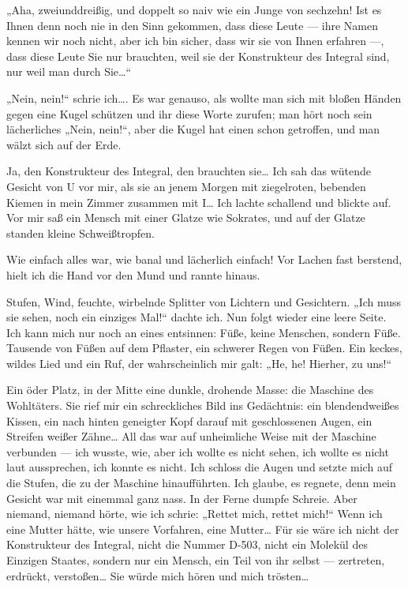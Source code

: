 „Aha, zweiunddreißig, und doppelt so naiv wie ein Junge von
sechzehn! Ist es Ihnen denn noch nie in den Sinn gekommen, dass
diese Leute — ihre Namen kennen wir noch nicht, aber ich bin
sicher, dass wir sie von Ihnen erfahren —, dass diese Leute Sie nur
brauchten, weil sie der Konstrukteur des Integral sind, nur weil
man durch Sie\ldots{}“

„Nein, nein!“ schrie ich\ldots{}. Es war genauso, als wollte man sich
mit bloßen Händen gegen eine Kugel schützen und ihr diese Worte
zurufen; man hört noch sein lächerliches „Nein, nein!“, aber die
Kugel hat einen schon getroffen, und man wälzt sich auf der Erde.

Ja, den Konstrukteur des Integral, den brauchten sie\ldots{} Ich sah das
wütende Gesicht von U vor mir, als sie an jenem Morgen mit
ziegelroten, bebenden Kiemen in mein Zimmer zusammen mit I\ldots{} Ich
lachte schallend und blickte auf. Vor mir saß ein Mensch mit einer
Glatze wie Sokrates, und auf der Glatze standen kleine
Schweißtropfen.

Wie einfach alles war, wie banal und lächerlich einfach! Vor Lachen
fast berstend, hielt ich die Hand vor den Mund und rannte hinaus.

Stufen, Wind, feuchte, wirbelnde Splitter von Lichtern und
Gesichtern. „Ich muss sie sehen, noch ein einziges Mal!“ dachte
ich. Nun folgt wieder eine leere Seite. Ich kann mich nur noch an
eines entsinnen: Füße, keine Menschen, sondern Füße. Tausende von
Füßen auf dem Pflaster, ein schwerer Regen von Füßen. Ein keckes,
wildes Lied und ein Ruf, der wahrscheinlich mir galt: „He, he!
Hierher, zu uns!“

Ein öder Platz, in der Mitte eine dunkle, drohende Masse: die
Maschine des Wohltäters. Sie rief mir ein schreckliches Bild ins
Gedächtnis: ein blendendweißes Kissen, ein nach hinten geneigter
Kopf darauf mit geschlossenen Augen, ein Streifen weißer Zähne\ldots{}
All das war auf unheimliche Weise mit der Maschine verbunden — ich
wusste, wie, aber ich wollte es nicht sehen, ich wollte es nicht
laut aussprechen, ich konnte es nicht. Ich schloss die Augen und
setzte mich auf die Stufen, die zu der Maschine hinaufführten. Ich
glaube, es regnete, denn mein Gesicht war mit einemmal ganz nass.
In der Ferne dumpfe Schreie. Aber niemand, niemand hörte, wie ich
schrie: „Rettet mich, rettet mich!“ Wenn ich eine Mutter hätte, wie
unsere Vorfahren, eine Mutter\ldots{} Für sie wäre ich nicht der
Konstrukteur des Integral, nicht die Nummer D-503, nicht ein
Molekül des Einzigen Staates, sondern nur ein Mensch, ein Teil von
ihr selbst — zertreten, erdrückt, verstoßen\ldots{} Sie würde mich hören
und mich trösten\ldots{}

